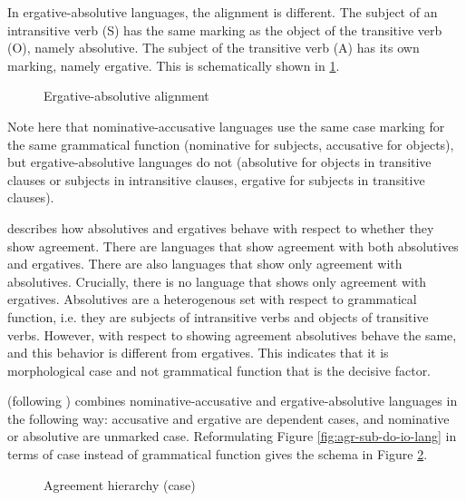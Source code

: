 In ergative-absolutive languages, the alignment is different. The subject of an intransitive verb (S) has the same marking as the object of the transitive verb (O), namely absolutive. The subject of the transitive verb (A) has its own marking, namely ergative. This is schematically shown in \ref{fig:erg-abs-lang}.

\begin{figure}[ht]
  \centering
  \caption{Ergative-absolutive alignment}
  \label{fig:erg-abs-lang}
\end{figure}

Note here that nominative-accusative languages use the same case marking for the same grammatical function (nominative for subjects, accusative for objects), but ergative-absolutive languages do not (absolutive for objects in transitive clauses or subjects in intransitive clauses, ergative for subjects in transitive clauses).

\citet{bobaljik2006} describes how absolutives and ergatives behave with respect to whether they show agreement. There are languages that show agreement with both absolutives and ergatives. There are also languages that show only agreement with absolutives. Crucially, there is no language that shows only agreement with ergatives. Absolutives are a heterogenous set with respect to grammatical function, i.e. they are subjects of intransitive verbs and objects of transitive verbs. However, with respect to showing agreement absolutives behave the same, and this behavior is different from ergatives. This indicates that it is morphological case and not grammatical function that is the decisive factor.

\citeauthor{bobaljik2006} (following \citealt{marantz2000}) combines nominative-accusative and ergative-absolutive languages in the following way: accusative and ergative are dependent cases, and nominative or absolutive are unmarked case. Reformulating Figure \ref{fig:agr-sub-do-io-lang} in terms of case instead of grammatical function gives the schema in Figure \ref{fig:agr-def-dep-dat}.

\begin{figure}[H]
  \centering
  \caption{Agreement hierarchy (case)}
  \label{fig:agr-def-dep-dat}
\end{figure}

